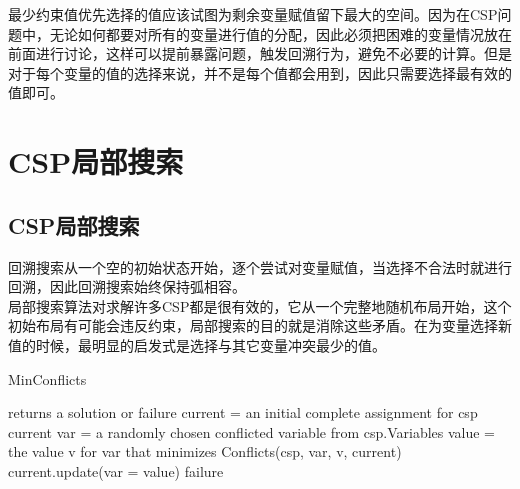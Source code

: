 最少约束值优先选择的值应该试图为剩余变量赋值留下最大的空间。因为在CSP问题中，无论如何都要对所有的变量进行值的分配，因此必须把困难的变量情况放在前面进行讨论，这样可以提前暴露问题，触发回溯行为，避免不必要的计算。但是对于每个变量的值的选择来说，并不是每个值都会用到，因此只需要选择最有效的值即可。\\

\newpage

\section{CSP局部搜索}

\subsection{CSP局部搜索}

回溯搜索从一个空的初始状态开始，逐个尝试对变量赋值，当选择不合法时就进行回溯，因此回溯搜索始终保持弧相容。\\

局部搜索算法对求解许多CSP都是很有效的，它从一个完整地随机布局开始，这个初始布局有可能会违反约束，局部搜索的目的就是消除这些矛盾。在为变量选择新值的时候，最明显的启发式是选择与其它变量冲突最少的值。\\

\begin{algorithm}[H]
    \caption{MinConflicts}
    \begin{algorithmic}[1]
         returns a solution or failure
        \State current = an initial complete assignment for csp
        \State \Return current
        \EndIf
        \State var = a randomly chosen conflicted variable from csp.Variables
        \State value = the value v for var that minimizes Conflicts(csp, var, v, current)
        \State current.update({var = value})
        \EndFor
        \State \Return failure
        \EndProcedure
    \end{algorithmic}
\end{algorithm}

\newpage